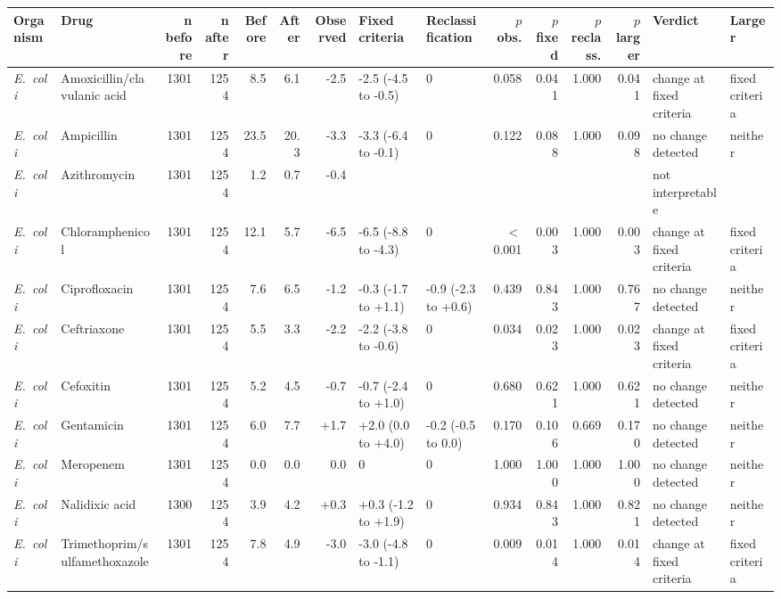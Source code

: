 \begin{table}[h]
\centering
\scriptsize
\begin{tabular}{llrrrrrllrrrrll}
\toprule
Organism & Drug & n before & n after & Before & After & Observed & Fixed criteria & Reclassification & $p$ obs. & $p$ fixed & $p$ reclass. & $p$ larger & Verdict & Larger \\
\midrule
\textit{E.~coli} & Amoxicillin/clavulanic acid & 1301 & 1254 & 8.5 & 6.1 & -2.5 & -2.5 (-4.5 to -0.5) & 0 & 0.058 & 0.041 & 1.000 & 0.041 & change at fixed criteria & fixed criteria \\
\textit{E.~coli} & Ampicillin & 1301 & 1254 & 23.5 & 20.3 & -3.3 & -3.3 (-6.4 to -0.1) & 0 & 0.122 & 0.088 & 1.000 & 0.098 & no change detected & neither \\
\textit{E.~coli} & Azithromycin & 1301 & 1254 & 1.2 & 0.7 & -0.4 &  &  &  &  &  &  & not interpretable &  \\
\textit{E.~coli} & Chloramphenicol & 1301 & 1254 & 12.1 & 5.7 & -6.5 & -6.5 (-8.8 to -4.3) & 0 & $<$0.001 & 0.003 & 1.000 & 0.003 & change at fixed criteria & fixed criteria \\
\textit{E.~coli} & Ciprofloxacin & 1301 & 1254 & 7.6 & 6.5 & -1.2 & -0.3 (-1.7 to +1.1) & -0.9 (-2.3 to +0.6) & 0.439 & 0.843 & 1.000 & 0.767 & no change detected & neither \\
\textit{E.~coli} & Ceftriaxone & 1301 & 1254 & 5.5 & 3.3 & -2.2 & -2.2 (-3.8 to -0.6) & 0 & 0.034 & 0.023 & 1.000 & 0.023 & change at fixed criteria & fixed criteria \\
\textit{E.~coli} & Cefoxitin & 1301 & 1254 & 5.2 & 4.5 & -0.7 & -0.7 (-2.4 to +1.0) & 0 & 0.680 & 0.621 & 1.000 & 0.621 & no change detected & neither \\
\textit{E.~coli} & Gentamicin & 1301 & 1254 & 6.0 & 7.7 & +1.7 & +2.0 (0.0 to +4.0) & -0.2 (-0.5 to 0.0) & 0.170 & 0.106 & 0.669 & 0.170 & no change detected & neither \\
\textit{E.~coli} & Meropenem & 1301 & 1254 & 0.0 & 0.0 & 0.0 & 0 & 0 & 1.000 & 1.000 & 1.000 & 1.000 & no change detected & neither \\
\textit{E.~coli} & Nalidixic acid & 1300 & 1254 & 3.9 & 4.2 & +0.3 & +0.3 (-1.2 to +1.9) & 0 & 0.934 & 0.843 & 1.000 & 0.821 & no change detected & neither \\
\textit{E.~coli} & Trimethoprim/sulfamethoxazole & 1301 & 1254 & 7.8 & 4.9 & -3.0 & -3.0 (-4.8 to -1.1) & 0 & 0.009 & 0.014 & 1.000 & 0.014 & change at fixed criteria & fixed criteria \\

\end{tabular}
\end{table}
